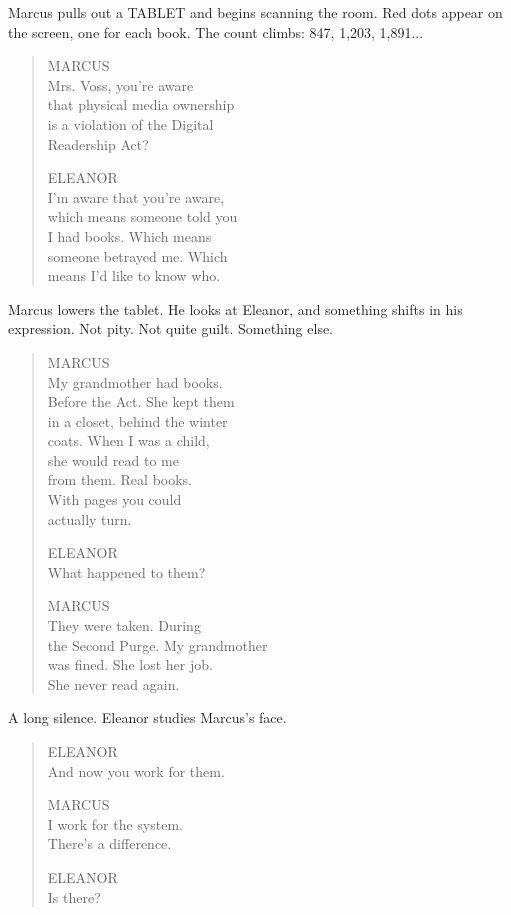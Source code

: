 \documentclass[
    language=english,
    doctype=screenplay,
    institution=none,
]{../../omnilatex}
\begin{document}
Marcus pulls out a TABLET and begins scanning the room. Red dots appear on the screen, one for each book. The count climbs: 847, 1,203, 1,891...

\begin{quote}
MARCUS\\
Mrs. Voss, you're aware\\
that physical media ownership\\
is a violation of the Digital\\
Readership Act?

ELEANOR\\
I'm aware that you're aware,\\
which means someone told you\\
I had books. Which means\\
someone betrayed me. Which\\
means I'd like to know who.
\end{quote}

Marcus lowers the tablet. He looks at Eleanor, and something shifts in his expression. Not pity. Not quite guilt. Something else.

\begin{quote}
MARCUS\\
My grandmother had books.\\
Before the Act. She kept them\\
in a closet, behind the winter\\
coats. When I was a child,\\
she would read to me\\
from them. Real books.\\
With pages you could\\
actually turn.

ELEANOR\\
What happened to them?

MARCUS\\
They were taken. During\\
the Second Purge. My grandmother\\
was fined. She lost her job.\\
She never read again.
\end{quote}

A long silence. Eleanor studies Marcus's face.

\begin{quote}
ELEANOR\\
And now you work for them.

MARCUS\\
I work for the system.\\
There's a difference.

ELEANOR\\
Is there?
\end{quote}
\end{document}
